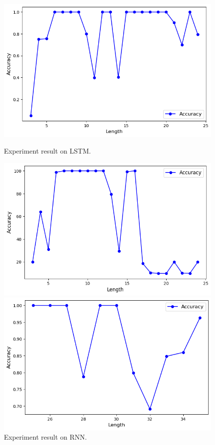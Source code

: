 \documentclass[12pt]{article}
\begin{document}
\begin{figure}[htbp]
    \centering
    \begin{minipage}{0.3\textwidth}
        \centering
        \includegraphics[width=\textwidth]{fig1.png}
        \caption{Experiment result on LSTM.}
        \label{fig:p1}
    \end{minipage}
    \hfill
    \begin{minipage}{0.3\textwidth}
        \centering
        \includegraphics[width=\textwidth]{fig2.png}
        \caption{Experiment result on RNN.}
        \label{fig:p2}
    \end{minipage}
    \hfill
    \begin{minipage}{0.3\textwidth}
        \centering
        \includegraphics[width=\textwidth]{fig3.png}

\end{minipage}
\end{figure}
\end{document}
